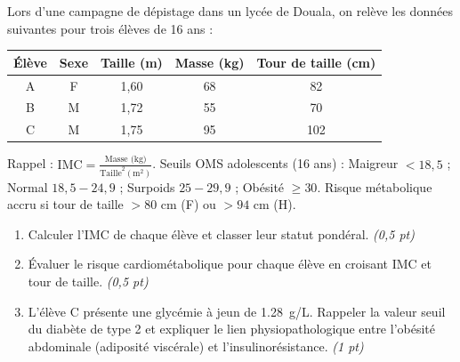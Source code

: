 \documentclass[11pt]{article}
\begin{document}
\begin{exercice}
Lors d'une campagne de dépistage dans un lycée de Douala, on relève les données suivantes pour trois élèves de 16 ans :
\begin{center}
\begin{tabular}{c c c c c}
\hline
\textbf{Élève} & \textbf{Sexe} & \textbf{Taille (m)} & \textbf{Masse (kg)} & \textbf{Tour de taille (cm)} \\
\hline
A & F & 1,60 & 68 & 82 \\
B & M & 1,72 & 55 & 70 \\
C & M & 1,75 & 95 & 102 \\
\hline
\end{tabular}
\end{center}
Rappel : $\text{IMC} = \frac{\text{Masse (kg)}}{\text{Taille}^2 (\text{m}^2)}$. Seuils OMS adolescents (16 ans) : Maigreur $< 18,5$ ; Normal $18,5-24,9$ ; Surpoids $25-29,9$ ; Obésité $\ge 30$. Risque métabolique accru si tour de taille $> 80$ cm (F) ou $> 94$ cm (H).
\begin{enumerate}
    \item Calculer l'IMC de chaque élève et classer leur statut pondéral. \textit{(0,5 pt)}
    \item Évaluer le risque cardiométabolique pour chaque élève en croisant IMC et tour de taille. \textit{(0,5 pt)}
    \item L'élève C présente une glycémie à jeun de \SI{1,28}{g/L}. Rappeler la valeur seuil du diabète de type 2 et expliquer le lien physiopathologique entre l'obésité abdominale (adiposité viscérale) et l'insulinorésistance. \textit{(1 pt)}
\end{enumerate}
\end{exercice}
\end{document}

